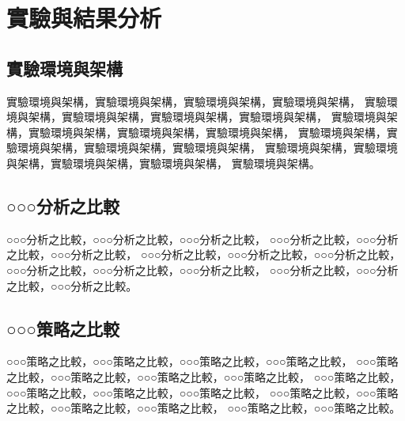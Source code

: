 \chapter {實驗與結果分析}
\label{chapter:experiments}

\section{實驗環境與架構}
    實驗環境與架構，實驗環境與架構，實驗環境與架構，實驗環境與架構，
    實驗環境與架構，實驗環境與架構，實驗環境與架構，實驗環境與架構，
    實驗環境與架構，實驗環境與架構，實驗環境與架構，實驗環境與架構，
    實驗環境與架構，實驗環境與架構，實驗環境與架構，實驗環境與架構，
    實驗環境與架構，實驗環境與架構，實驗環境與架構，實驗環境與架構，
    實驗環境與架構。

\section{○○○分析之比較}
    ○○○分析之比較，○○○分析之比較，○○○分析之比較，
    ○○○分析之比較，○○○分析之比較，○○○分析之比較，
    ○○○分析之比較，○○○分析之比較，○○○分析之比較，
    ○○○分析之比較，○○○分析之比較，○○○分析之比較，
    ○○○分析之比較，○○○分析之比較，○○○分析之比較。

\section{○○○策略之比較}
    ○○○策略之比較，○○○策略之比較，○○○策略之比較，○○○策略之比較，
    ○○○策略之比較，○○○策略之比較，○○○策略之比較，○○○策略之比較，
    ○○○策略之比較，○○○策略之比較，○○○策略之比較，○○○策略之比較，
    ○○○策略之比較，○○○策略之比較，○○○策略之比較，○○○策略之比較，
    ○○○策略之比較，○○○策略之比較。











































